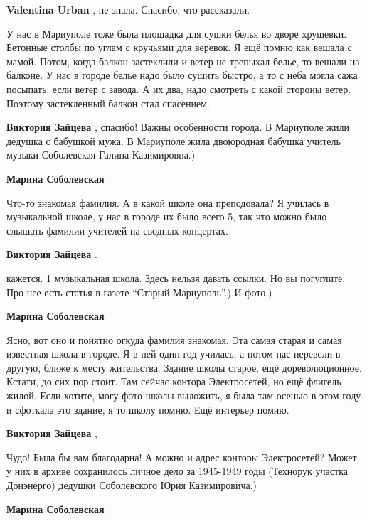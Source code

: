 \begin{itemize}
\textbf{Valentina Urban} , не знала. Спасибо, что рассказали.


У нас в Мариуполе тоже была площадка для сушки белья во дворе хрущевки.
Бетонные столбы по углам с кручьями для веревок. Я ещё помню как вешала с
мамой. Потом, когда балкон застеклили и ветер не трепыхал белье, то вешали на
балконе. У нас в городе белье надо было сушить быстро, а то с неба могла сажа
посыпать, если ветер с завода. А их два, надо смотреть с какой стороны ветер.
Поэтому застекленный балкон стал спасением.

\begin{itemize} %
\textbf{Виктория Зайцева} , спасибо! Важны особенности города. В Мариуполе жили дедушка с бабушкой мужа. В Мариуполе жила двоюродная бабушка учитель музыки Соболевская Галина Казимировна.)

\begin{itemize} %
\textbf{Марина Соболевская} 

Что-то знакомая фамилия. А в какой школе она преподовала? Я училась в
музыкальной школе, у нас в городе их было всего 5, так что можно было слышать
фамилии учителей на сводных концертах.


\textbf{Виктория Зайцева} . 

кажется. 1 музыкальная школа. Здесь нельзя давать ссылки. Но вы погуглите. Про
нее есть статья в газете \enquote{Старый Мариуполь}.) И фото.)

\textbf{Марина Соболевская} 

Ясно, вот оно и понятно огкуда фамилия знакомая. Эта самая старая и самая
известная школа в городе. Я в ней один год училась, а потом нас перевели в
другую, ближе к месту жительства. Здание школы старое, ещё дореволюционное.
Кстати, до сих пор стоит. Там сейчас контора Электросетей, но ещё флигель
жилой. Если хотите, могу фото школы выложить, я была там осенью в этом году и
сфоткала это здание, я то школу помню. Ещё интерьер помню.

\textbf{Виктория Зайцева} , 

Чудо! Была бы вам благодарна! А можно и адрес конторы Электросетей? Может у них
в архиве сохранилось личное дело за 1945-1949 годы (Технорук участка Донэнерго)
дедушки Соболевского Юрия Казимировича.)


\textbf{Марина Соболевская} 


\end{itemize}
\end{itemize}
\end{itemize}
